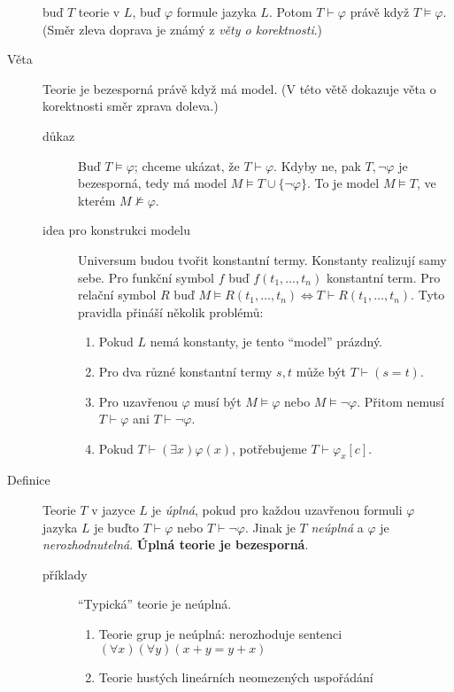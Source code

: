 \documentclass[a4paper]{article}
\begin{document}
\begin{description}
			buď $T$ teorie v $L$, buď $\varphi$ formule jazyka $L$. Potom $T \vdash \varphi$ právě
			když $T \models \varphi$. (Směr zleva doprava je známý z \textit{věty o korektnosti}.)
		\item[Věta] Teorie je bezesporná právě když má model. (V této větě dokazuje
			věta o korektnosti směr zprava doleva.)
			\begin{description}
				\item[důkaz] Buď $T \models \varphi$; chceme ukázat, že $T \vdash \varphi$.
					Kdyby ne, pak $T, \neg \varphi$ je bezesporná, tedy má model
					$M \models T \cup \{\neg \varphi\}$. To je model $M \models T$,
					ve kterém $M \not \models \varphi$.
				\item[idea pro konstrukci modelu] Universum budou tvořit
					konstantní termy. Konstanty realizují samy sebe.
					Pro funkční symbol $f$ buď $f(t_1, \ldots, t_n)$ konstantní term.
					Pro relační symbol $R$ buď $M \models R(t_1, \ldots, t_n) \iff
					T \vdash R(t_1, \ldots, t_n)$. Tyto pravidla přináší několik
					problémů:
					\begin{enumerate}
						\item Pokud $L$ nemá konstanty, je tento \enquote{model} prázdný.
						\item Pro dva různé konstantní termy $s, t$ může být
							$T \vdash (s = t)$.
						\item Pro uzavřenou $\varphi$ musí být $M \models \varphi$ nebo
							$M \models \neg \varphi$. Přitom nemusí $T \vdash \varphi$
							ani $T \vdash \neg \varphi$.
						\item Pokud $T \vdash (\exists x) \varphi(x)$, potřebujeme
							$T \vdash \varphi_x[c]$.
					\end{enumerate}
			\end{description}
		\item[Definice] Teorie $T$ v jazyce $L$ je \textit{úplná}, pokud pro
			každou uzavřenou formuli $\varphi$ jazyka $L$ je buďto $T \vdash \varphi$
			nebo $T \vdash \neg \varphi$. Jinak je $T$ \textit{neúplná} a
			$\varphi$ je \textit{nerozhodnutelná}. \textbf{Úplná teorie
			je bezesporná}.
			\begin{description}
				\item[příklady] \enquote{Typická} teorie je neúplná.
					\begin{enumerate}
						\item Teorie grup je neúplná: nerozhoduje sentenci
							$(\forall x)(\forall y)(x + y = y + x)$
						\item Teorie hustých lineárních neomezených uspořádání

\end{enumerate}
\end{description}
\end{description}
\end{document}
